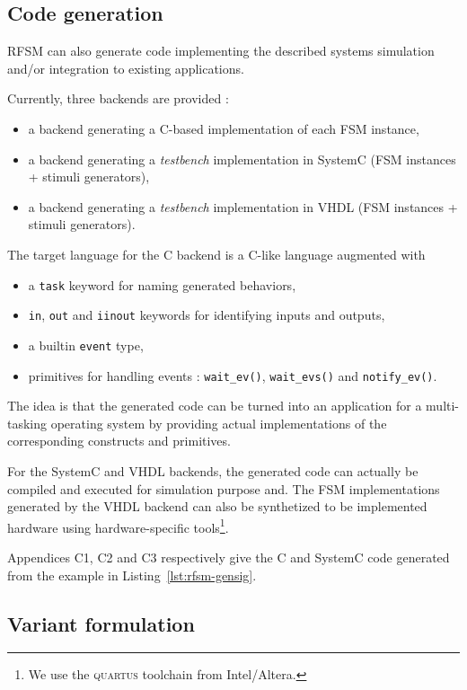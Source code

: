 \subsection*{Code generation}
\label{sec:code-generation-1}

RFSM can also generate code implementing the described systems simulation and/or
integration to existing applications.

\medskip
Currently, three backends are provided :
\begin{itemize}
\item a backend generating a C-based implementation of each FSM instance,
\item a backend generating a \emph{testbench} implementation in SystemC (FSM instances + stimuli
  generators),
\item a backend generating a \emph{testbench} implementation in VHDL (FSM instances + stimuli
  generators).
\end{itemize}

\medskip
The target language for the C backend is a C-like language augmented with
\begin{itemize}
\item a \verb|task| keyword for naming generated behaviors,
\item \verb|in|, \verb|out| and \verb|iinout| keywords for identifying inputs and outputs,
\item a builtin \verb|event| type,
\item primitives for handling events : \verb|wait_ev()|, \verb|wait_evs()| and
  \verb|notify_ev()|. 
\end{itemize}
The idea is that the generated code can be turned into an application for a multi-tasking operating
system by providing actual implementations of the corresponding constructs and primitives.

\medskip
For the SystemC and VHDL backends, the generated code can actually be compiled and executed for
simulation purpose and. The FSM implementations generated by the VHDL backend can also be
synthetized to be implemented hardware using hardware-specific tools\footnote{We use the
  \textsc{quartus} toolchain from Intel/Altera.}. 

\medskip
Appendices C1, C2 and C3 respectively give the C and SystemC code generated from the example in
Listing~\ref{lst:rfsm-gensig}. 

\subsection*{Variant formulation}
\label{sec:variant-formulation}

